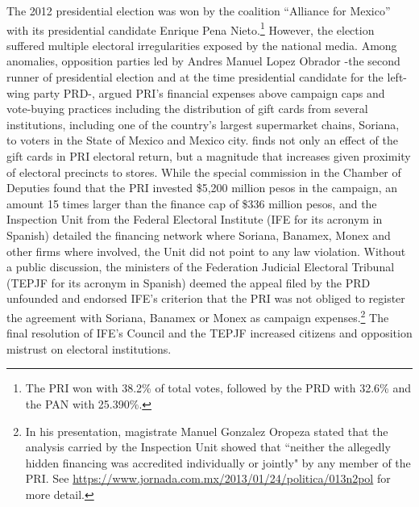 \documentclass[12pt]{amsart}
\numberwithin{equation}{section}
\theoremstyle{definition}
\theoremstyle{definition}
\theoremstyle{definition}
\begin{document}
\begin{appendix}
  The 2012 presidential election was won by the coalition ``Alliance for Mexico'' with its presidential candidate Enrique Pena Nieto.\footnote{The PRI won with 38.2\% of total votes, followed by the PRD with 32.6\% and the PAN with 25.390\%.} However, the election suffered multiple electoral irregularities exposed by the national media. Among anomalies, opposition parties led by Andres Manuel Lopez Obrador -the second runner of presidential election and at the time presidential candidate for the left-wing party PRD-, argued PRI's financial expenses above campaign caps and vote-buying practices including the distribution of gift cards from several institutions, including one of the country's largest supermarket chains, Soriana, to voters in the State of Mexico and Mexico city. \citet{cantu_2019} finds not only an effect of the gift cards in PRI electoral return, but a magnitude that increases given proximity of electoral precincts to stores. While the special commission in the Chamber of Deputies found that the PRI invested \$5,200 million pesos in the campaign, an amount 15 times larger than the finance cap of \$336 million pesos, and the Inspection Unit from the Federal Electoral Institute (IFE for its acronym in Spanish) detailed the financing network where Soriana, Banamex, Monex and other firms where involved, the Unit did not point to any law violation. Without a public discussion, the ministers of the Federation Judicial Electoral Tribunal (TEPJF for its acronym in Spanish) deemed the appeal filed by the PRD unfounded and endorsed IFE's  criterion that the PRI was not obliged to register the agreement with Soriana, Banamex or Monex as campaign expenses.\footnote{In his presentation, magistrate Manuel Gonzalez Oropeza stated that the analysis carried by the Inspection Unit showed that ``neither the allegedly hidden financing was accredited individually or jointly" by any member of the PRI. See \url{https://www.jornada.com.mx/2013/01/24/politica/013n2pol} for more detail.} The final resolution of IFE's Council and the TEPJF increased citizens and opposition mistrust on electoral institutions. 


\end{appendix}
\end{document}
